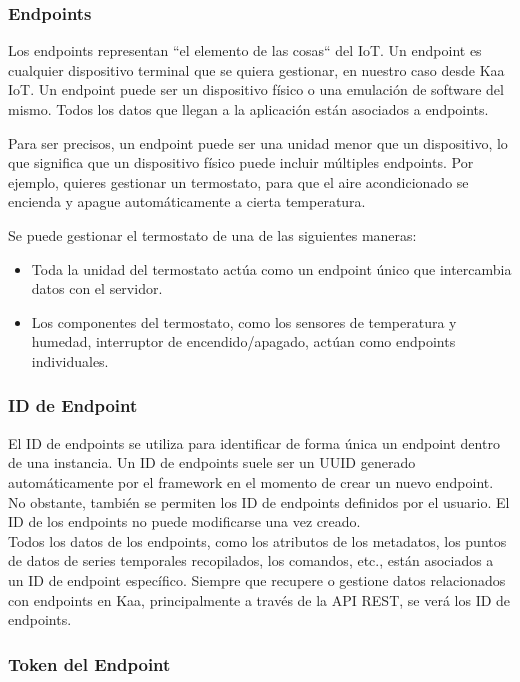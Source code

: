 \subsubsection{Endpoints}

Los endpoints representan ``el elemento de las cosas`` del IoT. Un endpoint es cualquier dispositivo terminal que se quiera gestionar, en nuestro caso desde Kaa IoT. Un endpoint puede ser un dispositivo físico o una emulación de software del mismo. Todos los datos que llegan a la aplicación están asociados a endpoints. \cite{kaaiotConcepts}

Para ser precisos, un endpoint puede ser una unidad menor que un dispositivo, lo que significa que un dispositivo físico puede incluir múltiples endpoints. Por ejemplo, quieres gestionar un termostato, para que el aire acondicionado se encienda y apague automáticamente a cierta temperatura.

Se puede gestionar el termostato de una de las siguientes maneras:

\begin{itemize}
    \item Toda la unidad del termostato actúa como un endpoint único que intercambia datos con el servidor.
    \item Los componentes del termostato, como los sensores de temperatura y humedad, interruptor de encendido/apagado, actúan como endpoints individuales.
\end{itemize}

\subsubsection{ID de Endpoint}

El ID de endpoints se utiliza para identificar de forma única un endpoint dentro de una instancia. Un ID de endpoints suele ser un UUID generado automáticamente por el framework en el momento de crear un nuevo endpoint. No obstante, también se permiten los ID de endpoints definidos por el usuario. El ID de los endpoints no puede modificarse una vez creado. \\

Todos los datos de los endpoints, como los atributos de los metadatos, los puntos de datos de series temporales recopilados, los comandos, etc., están asociados a un ID de endpoint específico. Siempre que recupere o gestione datos relacionados con endpoints en Kaa, principalmente a través de la API REST, se verá los ID de endpoints.

\subsubsection{Token del Endpoint} \label{llamada-mqtt}

